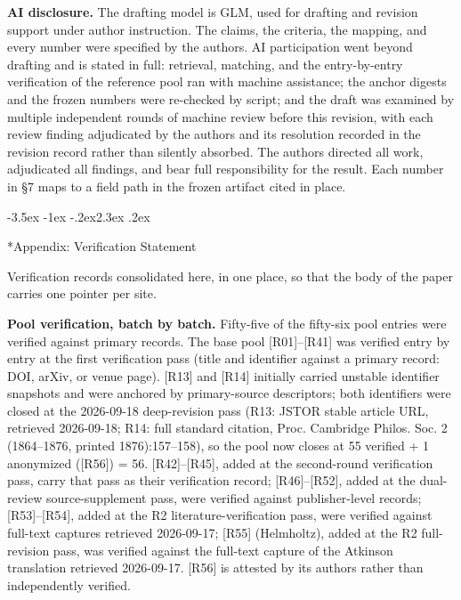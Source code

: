\documentclass[11pt,a4paper]{article}
\makeatletter
\renewcommand\section{\@startsection{section}{1}{\z@}%
  {-3.5ex \@plus -1ex \@minus -.2ex}{2.3ex \@plus .2ex}%
  {\normalfont\Large\bfseries\raggedright}}
\makeatother
\begin{document}
\textbf{AI disclosure.} The drafting model is GLM, used for drafting and revision support under author instruction. The claims, the criteria, the mapping, and every number were specified by the authors. AI participation went beyond drafting and is stated in full: retrieval, matching, and the entry-by-entry verification of the reference pool ran with machine assistance; the anchor digests and the frozen numbers were re-checked by script; and the draft was examined by multiple independent rounds of machine review before this revision, with each review finding adjudicated by the authors and its resolution recorded in the revision record rather than silently absorbed. The authors directed all work, adjudicated all findings, and bear full responsibility for the result. Each number in §7 maps to a field path in the frozen artifact cited in place.

\section*{Appendix: Verification Statement}

Verification records consolidated here, in one place, so that the body of the paper carries one pointer per site.

\textbf{Pool verification, batch by batch.} Fifty-five of the fifty-six pool entries were verified against primary records. The base pool [R01]–[R41] was verified entry by entry at the first verification pass (title and identifier against a primary record: DOI, arXiv, or venue page). [R13] and [R14] initially carried unstable identifier snapshots and were anchored by primary-source descriptors; both identifiers were closed at the 2026-09-18 deep-revision pass (R13: JSTOR stable article URL, retrieved 2026-09-18; R14: full standard citation, Proc. Cambridge Philos. Soc. 2 (1864--1876, printed 1876):157--158), so the pool now closes at 55 verified + 1 anonymized ([R56]) = 56. [R42]–[R45], added at the second-round verification pass, carry that pass as their verification record; [R46]–[R52], added at the dual-review source-supplement pass, were verified against publisher-level records; [R53]–[R54], added at the R2 literature-verification pass, were verified against full-text captures retrieved 2026-09-17; [R55] (Helmholtz), added at the R2 full-revision pass, was verified against the full-text capture of the Atkinson translation retrieved 2026-09-17. [R56] is attested by its authors rather than independently verified.
\end{document}
